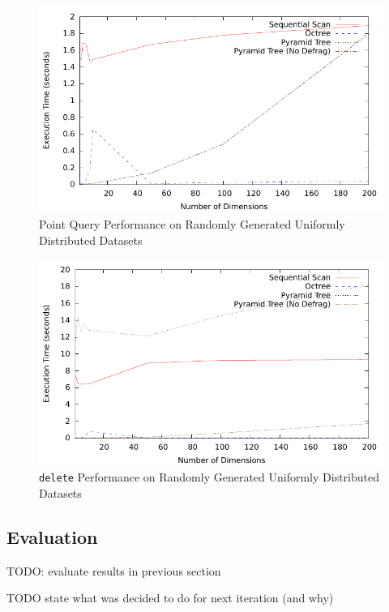 \begin{figure}
	\centering
	\includegraphics[scale=0.8]{../results/end_of_iteration1/all_pquery_randuniform.pdf}
	\caption{Point Query Performance on Randomly Generated Uniformly Distributed Datasets}
	\label{fig:perf-1-allpquery}
\end{figure}

\begin{figure}
	\centering
	\includegraphics[scale=0.8]{../results/end_of_iteration1/all_delete_randuniform.pdf}
	\caption{\texttt{delete} Performance on Randomly Generated Uniformly Distributed Datasets}
	\label{fig:perf-1-alldelete}
\end{figure}

\subsection{Evaluation}

TODO: evaluate results in previous section

TODO state what was decided to do for next iteration (and why)
